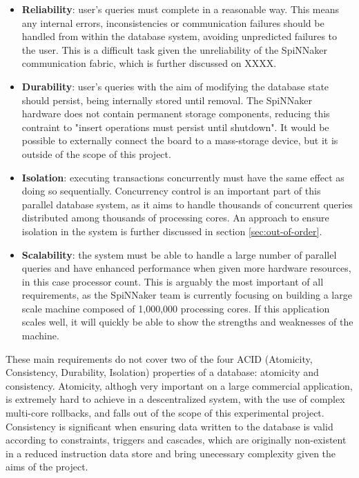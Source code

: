 \begin{itemize}
	\item \textbf{Reliability}: user's queries must complete in a reasonable way. This means any internal errors, inconsistencies or communication failures should be handled from within the database system, avoiding unpredicted failures to the user. This is a difficult task given the unreliability of the SpiNNaker communication fabric, which is further discussed on XXXX.
	\item \textbf{Durability}: user's queries with the aim of modifying the database state should persist, being internally stored until removal. The SpiNNaker hardware does not contain permanent storage components, reducing this contraint to "insert operations must persist until shutdown". It would be possible to externally connect the board to a mass-storage device, but it is outside of the scope of this project.
	\item \textbf{Isolation}: executing transactions concurrently must have the same effect as doing so sequentially. Concurrency control is an important part of this parallel database system, as it aims to handle thousands of concurrent queries distributed among thousands of processing cores. An approach to ensure isolation in the system is further discussed in section \ref{sec:out-of-order}.
	\item \textbf{Scalability}: the system must be able to handle a large number of parallel queries and have enhanced performance when given more hardware resources, in this case processor count.	This is arguably the most important of all requirements, as the SpiNNaker team is currently focusing on building a large scale machine composed of 1,000,000 processing cores. If this application scales well, it will quickly be able to show the strengths and weaknesses of the machine.
\end{itemize}

These main requirements do not cover two of the four ACID (Atomicity, Consistency, Durability, Isolation) properties of a database: atomicity and consistency. Atomicity, althogh very important on a large commercial application, is extremely hard to achieve in a descentralized system, with the use of complex multi-core rollbacks, and falls out of the scope of this experimental project. Consistency is significant when ensuring data written to the database is valid according to constraints, triggers and cascades, which are originally non-existent in a reduced instruction data store and bring unecessary complexity given the aims of the project.

